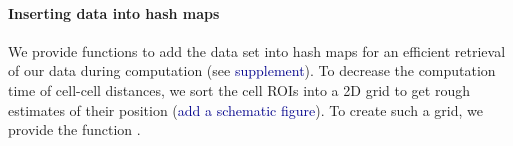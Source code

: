 \documentclass{report}
\begin{document}
%	
%		
%	
%	
%	
%	
%	
%	

\paragraph{Inserting data into hash maps} 
We provide functions to add the data set into hash maps for an efficient retrieval of our data during computation (see \textcolor{darkblue}{supplement}). To decrease the computation time of cell-cell distances, we sort the cell ROIs into a 2D grid to get rough estimates of their position (\textcolor{darkblue}{add a schematic figure}). To create such a grid, we provide the function . 

\end{document}
